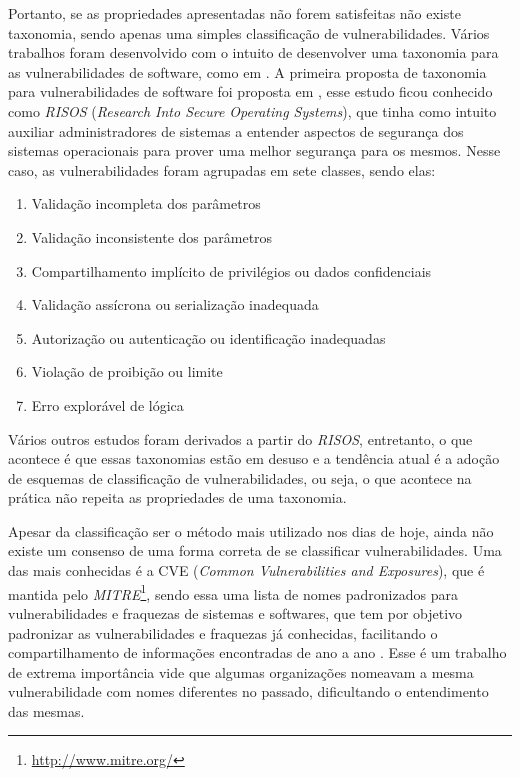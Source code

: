 Portanto, se as propriedades apresentadas não forem satisfeitas não existe
taxonomia, sendo apenas uma simples classificação de vulnerabilidades. Vários
trabalhos foram desenvolvido com o intuito de desenvolver uma taxonomia para as
vulnerabilidades de software, como em
. A primeira proposta de
taxonomia para vulnerabilidades de software foi proposta em
, esse estudo ficou conhecido como \textit{RISOS}
(\textit{Research Into Secure Operating Systems}), que tinha como intuito
auxiliar administradores de sistemas a entender aspectos de segurança dos
sistemas operacionais para prover uma melhor segurança para os mesmos. Nesse
caso, as vulnerabilidades foram agrupadas em sete classes, sendo elas:

\begin{enumerate}
  \item Validação incompleta dos parâmetros
  \item Validação inconsistente dos parâmetros
  \item Compartilhamento implícito de privilégios ou dados confidenciais
  \item Validação assícrona ou serialização inadequada
  \item Autorização ou autenticação ou identificação inadequadas
  \item Violação de proibição ou limite
  \item Erro explorável de lógica
\end{enumerate}

Vários outros estudos foram derivados a partir do \textit{RISOS}, entretanto, o
que acontece é que essas taxonomias estão em desuso e a tendência atual é a
adoção de esquemas de classificação de vulnerabilidades, ou seja, o que acontece
na prática não repeita as propriedades de uma taxonomia.

Apesar da classificação ser o método mais utilizado nos dias de hoje, ainda não
existe um consenso de uma forma correta de se classificar vulnerabilidades. Uma
das mais conhecidas é a CVE (\textit{Common Vulnerabilities and Exposures}), que
é mantida pelo \textit{MITRE}\footnote{\url{http://www.mitre.org/}}, sendo essa
uma lista de nomes padronizados para vulnerabilidades e fraquezas de sistemas e
softwares, que tem por objetivo padronizar as vulnerabilidades e fraquezas já
conhecidas, facilitando o compartilhamento de informações encontradas de ano a
ano \cite{gregio:2005}. Esse é um trabalho de extrema importância vide que
algumas organizações nomeavam a mesma vulnerabilidade com nomes diferentes no
passado, dificultando o entendimento das mesmas.

